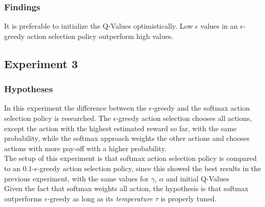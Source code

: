 \documentclass[11pt]{article}
\begin{document}
\subsubsection{Findings}
It is preferable to initialize the Q-Values optimistically. Low $\epsilon$ values in an $\epsilon$-greedy action selection policy outperform high values.

\subsection{Experiment 3}

\subsubsection{Hypotheses}
In this experiment the difference between the $\epsilon$-greedy and the softmax action selection policy is researched. The $\epsilon$-greedy action selection chooses all actions, except the action with the highest estimated reward so far, with the same probability, while the softmax approach weights the other actions and chooses actions with more pay-off with a higher probability.\\
The setup of this experiment is that softmax action selection policy is compared to an 0.1-$\epsilon$-greedy action selection policy, since this showed the best results in the previous experiment, with the same values for $\gamma$, $\alpha$ and initial Q-Values\\
Given the fact that softmax weights all action, the hypothesis is that softmax outperforms $\epsilon$-greedy as long as its \emph{temperature $\tau$} is properly tuned.
\end{document}
